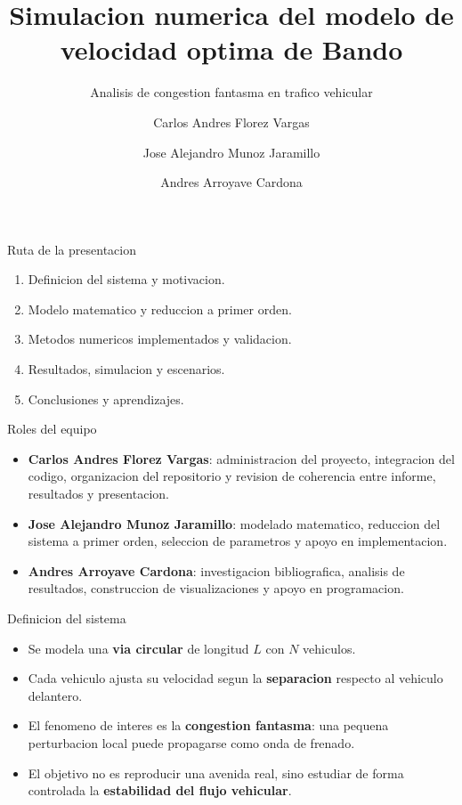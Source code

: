 \documentclass[aspectratio=169]{beamer}
\title{Simulacion numerica del modelo de velocidad optima de Bando}
\subtitle{Analisis de congestion fantasma en trafico vehicular}
\author{Carlos Andres Florez Vargas \and Jose Alejandro Munoz Jaramillo \and Andres Arroyave Cardona}
\institute{Universidad Pontificia Bolivariana \\ Modelamiento Matematico}
\date{}
\begin{document}
\begin{frame}
  \titlepage
\end{frame}

\begin{frame}{Ruta de la presentacion}
  \begin{enumerate}
    \item Definicion del sistema y motivacion.
    \item Modelo matematico y reduccion a primer orden.
    \item Metodos numericos implementados y validacion.
    \item Resultados, simulacion y escenarios.
    \item Conclusiones y aprendizajes.
  \end{enumerate}
\end{frame}

\begin{frame}{Roles del equipo}
  \begin{itemize}
    \item \textbf{Carlos Andres Florez Vargas}: administracion del proyecto, integracion del codigo, organizacion del repositorio y revision de coherencia entre informe, resultados y presentacion.
    \item \textbf{Jose Alejandro Munoz Jaramillo}: modelado matematico, reduccion del sistema a primer orden, seleccion de parametros y apoyo en implementacion.
    \item \textbf{Andres Arroyave Cardona}: investigacion bibliografica, analisis de resultados, construccion de visualizaciones y apoyo en programacion.
  \end{itemize}
\end{frame}

\begin{frame}{Definicion del sistema}
  \begin{itemize}
    \item Se modela una \textbf{via circular} de longitud $L$ con $N$ vehiculos.
    \item Cada vehiculo ajusta su velocidad segun la \textbf{separacion} respecto al vehiculo delantero.
    \item El fenomeno de interes es la \textbf{congestion fantasma}: una pequena perturbacion local puede propagarse como onda de frenado.
    \item El objetivo no es reproducir una avenida real, sino estudiar de forma controlada la \textbf{estabilidad del flujo vehicular}.
  \end{itemize}
\end{frame}
\end{document}
